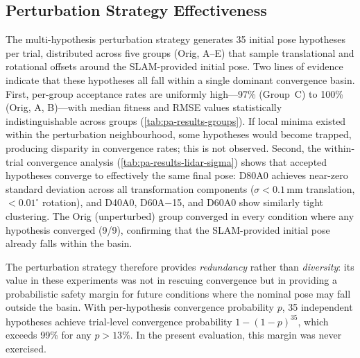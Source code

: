 \subsection{Perturbation Strategy Effectiveness}
\label{subsec:pa-discussion-perturbation}

The multi-hypothesis perturbation strategy generates 35 initial pose hypotheses per trial, distributed across five groups (Orig, A--E) that sample translational and rotational offsets around the SLAM-provided initial pose. Two lines of evidence indicate that these hypotheses all fall within a single dominant convergence basin. First, per-group acceptance rates are uniformly high---97\% (Group~C) to 100\% (Orig, A, B)---with median fitness and RMSE values statistically indistinguishable across groups (\cref{tab:pa-results-groups}). If local minima existed within the perturbation neighbourhood, some hypotheses would become trapped, producing disparity in convergence rates; this is not observed. Second, the within-trial convergence analysis (\cref{tab:pa-results-lidar-sigma}) shows that accepted hypotheses converge to effectively the same final pose: D80A0 achieves near-zero standard deviation across all transformation components ($\sigma < 0.1$\,mm translation, $< 0.01^{\circ}$ rotation), and D40A0, D60A$-$15, and D60A0 show similarly tight clustering. The Orig (unperturbed) group converged in every condition where any hypothesis converged (9/9), confirming that the SLAM-provided initial pose already falls within the basin.

The perturbation strategy therefore provides \emph{redundancy} rather than \emph{diversity}: its value in these experiments was not in rescuing convergence but in providing a probabilistic safety margin for future conditions where the nominal pose may fall outside the basin. With per-hypothesis convergence probability $p$, 35 independent hypotheses achieve trial-level convergence probability $1 - (1-p)^{35}$, which exceeds 99\% for any $p > 13\%$. In the present evaluation, this margin was never exercised.

